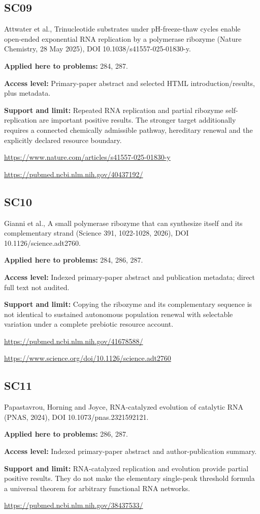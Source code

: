 \documentclass[11pt]{article}
\begin{document}
\subsection*{SC09}\label{check:SC09}

Attwater et al., Trinucleotide substrates under pH-freeze-thaw cycles enable open-ended exponential RNA replication by a polymerase ribozyme (Nature Chemistry, 28 May 2025), DOI 10.1038/s41557-025-01830-y.

\textbf{Applied here to problems:} 284, 287.

\textbf{Access level:} Primary-paper abstract and selected HTML introduction/results, plus metadata.

\textbf{Support and limit:} Repeated RNA replication and partial ribozyme self-replication are important positive results. The stronger target additionally requires a connected chemically admissible pathway, hereditary renewal and the explicitly declared resource boundary.

\url{https://www.nature.com/articles/s41557-025-01830-y}

\url{https://pubmed.ncbi.nlm.nih.gov/40437192/}

\subsection*{SC10}\label{check:SC10}

Gianni et al., A small polymerase ribozyme that can synthesize itself and its complementary strand (Science 391, 1022-1028, 2026), DOI 10.1126/science.adt2760.

\textbf{Applied here to problems:} 284, 286, 287.

\textbf{Access level:} Indexed primary-paper abstract and publication metadata; direct full text not audited.

\textbf{Support and limit:} Copying the ribozyme and its complementary sequence is not identical to sustained autonomous population renewal with selectable variation under a complete prebiotic resource account.

\url{https://pubmed.ncbi.nlm.nih.gov/41678588/}

\url{https://www.science.org/doi/10.1126/science.adt2760}

\subsection*{SC11}\label{check:SC11}

Papastavrou, Horning and Joyce, RNA-catalyzed evolution of catalytic RNA (PNAS, 2024), DOI 10.1073/pnas.2321592121.

\textbf{Applied here to problems:} 286, 287.

\textbf{Access level:} Indexed primary-paper abstract and author-publication summary.

\textbf{Support and limit:} RNA-catalyzed replication and evolution provide partial positive results. They do not make the elementary single-peak threshold formula a universal theorem for arbitrary functional RNA networks.

\url{https://pubmed.ncbi.nlm.nih.gov/38437533/}
\end{document}

